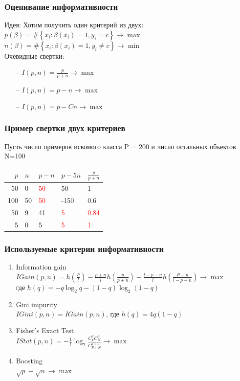 \documentclass[12pt]{beamer}
\begin{document}
\begin{frame}\frametitle{Оценивание информативности}
Идея: Хотим получить один критерий из двух:\\
\vspace{5mm}
${ p(\beta) = \# \left\{ x_i: \beta(x_i) = 1 , y_i = c \right\} \rightarrow \max  }$ 
${ n(\beta) = \# \left\{ x_i: \beta(x_i) = 1 , y_i \neq c \right\} \rightarrow \min}$ \\
\vspace{5mm}
	Очевидные свертки:\\
	\begin{itemize}
		\item[--] $I(p, n) = \frac{p}{p+n} \rightarrow \max$
		\item[--] $I(p, n) = p-n \rightarrow \max$
		\item[--] $I(p, n) = p-Cn \rightarrow \max$			
	\end{itemize}
\end{frame}

\begin{frame}\frametitle{Пример свертки двух критериев}
Пусть число примеров искомого класса P = 200 и число остальных объектов N=100\\
\vspace{5mm}
\begin{tabular}{|r l|l|l|l|}
  \hline 
  $p$ & $n$ & $p-n$ & $p-5n$ & $\frac{p}{p+n}$\\ 
  \hline \hline
  50 & 0 & \textcolor{red}{50} & 50 & 1\\
  \hline
  100 & 50 & \textcolor{red}{50} & -150 & 0.6\\
  \hline \hline
  50 & 9 & 41 & \textcolor{red}{5} & \textcolor{red}{0.84}\\
  \hline  
  5 & 0 & 5 & \textcolor{red}{5} & \textcolor{red}{1}\\  
  \hline 
\end{tabular}
\end{frame}

\begin{frame}\frametitle{Используемые критерии информативности}
\begin{enumerate}[--]
\item Information gain
$IGain(p,n) = h(\frac{P}{l}) - \frac{p+n}{l}h(\frac{p}{p+n}) - \frac{l-p-n}{l}h(\frac{P-p}{l-p-n}) \rightarrow \max$\\
где $h(q) = -q\log_2q - (1-q)\log_2(1-q)$
\item Gini impurity\\
$IGini(p,n)=IGain(p,n)$, где $h(q)=4q(1-q)$
\item Fisher’s Exact Test\\
$IStat(p,n) = -\frac{1}{l}\log_2\frac{C_P^pC_N^n}{C_{P+N}^{p+n}} \rightarrow \max$
\item Boosting\\
$\sqrt{p} - \sqrt{n} \rightarrow \max$
\end{enumerate}

\end{frame}
\end{document}
